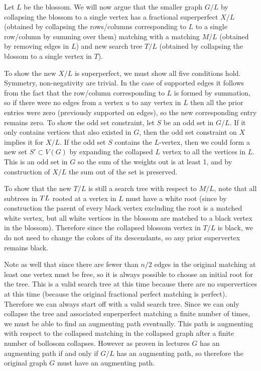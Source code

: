\documentclass{hmcpset}
\begin{document}
\begin{solution}
\begin{enumerate}[label=(\Alph*)]
Let $L$ be the blossom. We will now argue that the smaller graph $G/L$ by collapsing
the blossom to a single vertex has a fractional superperfect $X/L$ (obtained by collapsing
the rows/columns corresponding to $L$ to a single row/column by summing over them)
matching with a matching $M/L$ (obtained by removing edges in $L$)
and new search tree $T/L$ (obtained by collapsing the blossom to a single vertex in $T$).

To show the new $X/L$ is superperfect, we must show all five conditions hold. Symmetry,
non-negativity are trivial. In the case of supported edges it follows from the fact
that the row/column corresponding to $L$ is formed by summation, so if there were no
edges from a vertex $u$ to any vertex in $L$ then all the prior entries were zero
(previously supported on edges), so the new corresponding entry remains zero.
To show the odd set constraint,
let $S$ be an odd set in $G/L$. If it only contains vertices that also existed in
$G$, then the odd set constraint on $X$ implies it for $X/L$. If the odd set $S$
contains the $L$-vertex, then we could form a new set $S' \subset V(G)$ by
expanding the collapsed $L$ vertex to all the vertices in $L$. This is an odd set
in $G$ so the sum of the weights out is at least 1, and by construction of $X/L$ the
sum out of the set is preserved.

To show that the new $T/L$ is still a search tree with respect to $M/L$, note that
all subtrees in $T\\L$ rooted at a vertex in $L$ must have a white
root (since by construction the parent of every black vertex excluding the root
is a matched white vertex, but all white vertices in the blossom are matched
to a black vertex in the blossom). Therefore since the collapsed blossom vertex
in $T/L$ is black, we do not need to change the colors of its descendants, so
any prior supervertex remains black.

Note as well that since there are fewer than $n/2$ edges in the original matching
at least one vertex must be free, so it is always possible to choose an initial root
for the tree.
This is a valid search tree at this time because there are no supervertices
at this time (because the original fractional perfect matching is perfect).
Therefore we can always start off with a valid search tree.
Since we can only collapse the tree and associated superperfect matching a finite 
number of times, we must be able to find an augmenting path eventually.
This path is augmenting with respect to the collapsed matching in the
collapsed graph after a finite number of bollosom collapses.
However as proven in lectures $G$ has an augmenting path
if and only if $G/L$ has an augmenting path, so therefore the original graph
$G$ must have an augmenting path.


\end{enumerate}
\end{solution}
\end{document}

